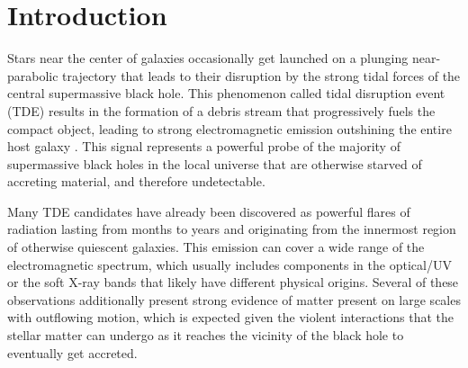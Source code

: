 \documentclass[a4paper,fleqn,usenatbib]{mnras}
\begin{document}



\vspace{-10cm}



\section{Introduction}

Stars near the center of galaxies occasionally get launched on a plunging near-parabolic trajectory that leads to their disruption by the strong tidal forces of the central supermassive black hole. This phenomenon called tidal disruption event (TDE) results in the formation of a debris stream that progressively fuels the compact object, leading to strong electromagnetic emission outshining the entire host galaxy \citep{rees1988}. This signal represents a powerful probe of the majority of supermassive black holes in the local universe that are otherwise starved of accreting material, and therefore undetectable.



Many TDE candidates have already been discovered as powerful flares of radiation lasting from months to years and originating from the innermost region of otherwise quiescent galaxies. This emission can cover a wide range of the electromagnetic spectrum, which usually includes components in the optical/UV or the soft X-ray bands \citep{komossa2008-j095,gezari2012,chornock2014,saxton2017,leloudas2016,gezari2017-15oi,leloudas2019,holoien2019,van_velzen2019,hung2020,short2020} that likely have different physical origins. Several of these observations additionally present strong evidence of matter present on large scales with outflowing motion, which is expected given the violent interactions that the stellar matter can undergo as it reaches the vicinity of the black hole to eventually get accreted.
\end{document}
